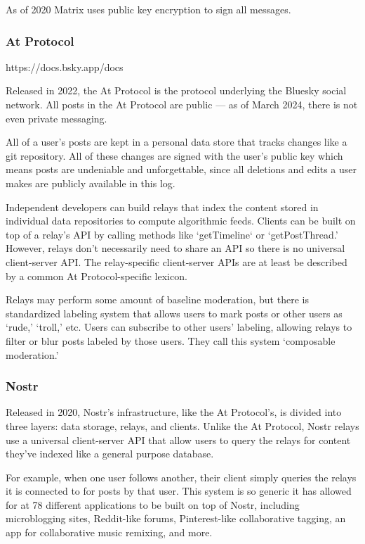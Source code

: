 As of 2020 Matrix uses public key encryption to sign all messages.


\subsubsection{At Protocol}
https://docs.bsky.app/docs

Released in 2022, the At Protocol is the protocol underlying the Bluesky social network.
All posts in the At Protocol are public --- as of March 2024, there is not even private messaging.

All of a user's posts are kept in a personal data store that tracks changes like a git repository. All of these changes are signed with the user's public key which means posts are undeniable and unforgettable, since all deletions and edits a user makes are publicly available in this log.

Independent developers can build relays that index the content stored in individual data repositories to compute algorithmic feeds. Clients can be built on top of a relay's API by calling methods like `getTimeline` or `getPostThread.' However, relays don't necessarily need to share an API so there is no universal client-server API.
The relay-specific client-server APIs are at least be described by a common At Protocol-specific lexicon.

Relays may perform some amount of baseline moderation, but there is standardized labeling system that allows users to mark posts or other users as `rude,' `troll,' etc.
Users can subscribe to other users' labeling, allowing relays to filter or blur posts labeled by those users.
They call this system `composable moderation.'

\subsubsection{Nostr}

Released in 2020, Nostr's infrastructure, like the At Protocol's, is divided into three layers: data storage, relays, and clients.
Unlike the At Protocol, Nostr relays use a universal client-server API that allow users to query the relays for content they've indexed like a general purpose database.

For example, when one user follows another, their client simply queries the relays it is connected to for posts by that user.
This system is so generic it has allowed for at 78 different applications to be built on top of Nostr, including microblogging sites, Reddit-like forums, Pinterest-like collaborative tagging, an app for collaborative music remixing, and more.

